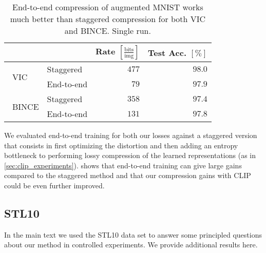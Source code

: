\documentclass[final]{article}
\begin{document}
\begin{table}[h]
\caption{
End-to-end compression of augmented MNIST works much better than staggered compression for both VIC and BINCE. Single run.
}
\small
\center
\begin{tabular}{llrr}
\toprule
&& Rate $[\frac{\text{bits}}{\text{img}}]$ & Test Acc. $[\%]$  \\ 
\midrule 
\multirow{2}{*}{\centering  ~VIC } 
 & Staggered  &  $477$  & $98.0$   \\ 
  & End-to-end &  $79$  & $97.9$  \\  
\midrule 
\multirow{2}{*}{\centering  ~BINCE  }
 & Staggered &  $358$  &  $97.4$ \\
   & End-to-end & $131$   &  $97.8$  \\ 
\bottomrule
\end{tabular}
\label{table:end2end}
\end{table} 

We evaluated end-to-end training for both our losses against a staggered version that consists in first optimizing the distortion and then adding an entropy bottleneck to performing lossy compression of the learned representations (as in \cref{sec:clip_experiments}).
 shows that end-to-end training can give large gains compared to the staggered method and that our compression gains with CLIP could be even further improved.


\subsection{STL10}
\label{appx:stl10}
In the main text we used the STL10 data set to answer some principled questions about our method in controlled experiments.
We provide additional results here.
\end{document}
